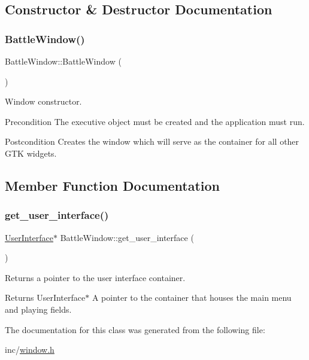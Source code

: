 \subsection{Constructor \& Destructor Documentation}
\mbox{\label{classBattleWindow_a9f7e70c225b63503da672c0c6eab0c08}} 
\subsubsection{\texorpdfstring{BattleWindow()}{BattleWindow()}}
{\footnotesize\ttfamily Battle\+Window\+::\+Battle\+Window (\begin{DoxyParamCaption}{ }\end{DoxyParamCaption})}



Window constructor. 

\begin{DoxyPrecond}{Precondition}
The executive object must be created and the application must run. 
\end{DoxyPrecond}
\begin{DoxyPostcond}{Postcondition}
Creates the window which will serve as the container for all other G\+TK widgets. 
\end{DoxyPostcond}


\subsection{Member Function Documentation}
\mbox{\label{classBattleWindow_a1190090493fa2ad632c5afb2a53744f2}} 
\subsubsection{\texorpdfstring{get\_user\_interface()}{get\_user\_interface()}}
{\footnotesize\ttfamily \mbox{\hyperlink{classUserInterface}{User\+Interface}}$\ast$ Battle\+Window\+::get\+\_\+user\+\_\+interface (\begin{DoxyParamCaption}{ }\end{DoxyParamCaption})}



Returns a pointer to the user interface container. 

\begin{DoxyReturn}{Returns}
User\+Interface$\ast$ A pointer to the container that houses the main menu and playing fields. 
\end{DoxyReturn}


The documentation for this class was generated from the following file\+:\begin{DoxyCompactItemize}
\item 
inc/\mbox{\hyperlink{window_8h}{window.\+h}}\end{DoxyCompactItemize}
